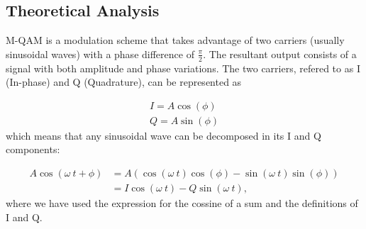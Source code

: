 
\subsection{Theoretical Analysis }

M-QAM is a modulation scheme that takes advantage of two carriers (usually sinusoidal waves) with a phase difference of $\frac{\pi}{2}$. The resultant output consists of a signal with both amplitude and phase variations. The two carriers, refered to as I (In-phase) and Q (Quadrature), can be represented as 

\begin{align}
	I=A\cos(\phi) \\
	Q=A\sin(\phi)
\end{align}
which means that any sinusoidal wave can be decomposed in its I and Q components:

\begin{align}
	A\cos(\omega~t+\phi)&=A\left(\cos(\omega~t)\cos(\phi)-\sin(\omega~t)\sin(\phi)\right) \\
	&=I\cos(\omega~t)-Q\sin(\omega~t),
\end{align} 
where we have used the expression for the cossine of a sum and the definitions of I and Q.

